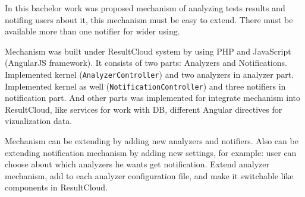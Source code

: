 In this bachelor work was proposed mechanism of analyzing tests results and notifing users about it, this mechanism must be easy to extend. There must be available more than one notifier for wider using.

Mechanism was built under ResultCloud system by using PHP and JavaScript (AngularJS framework). It consists of two parts: Analyzers and Notifications. Implemented kernel (\texttt{AnalyzerController}) and two analyzers in analyzer part. Implemented kernel as well (\texttt{NotificationController}) and three notifiers in notification part. And other parts was implemented for integrate mechanism into ResultCloud, like services for work with DB, different Angular directives for vizualization data.

Mechanism can be extending by adding new analyzers and notifiers. Also can be extending notification mechanism by adding new settings, for example: user can choose about which analyzers he wants get notification. Extend analyzer mechanism, add to each analyzer configuration file, and make it switchable like components in ResultCloud.

